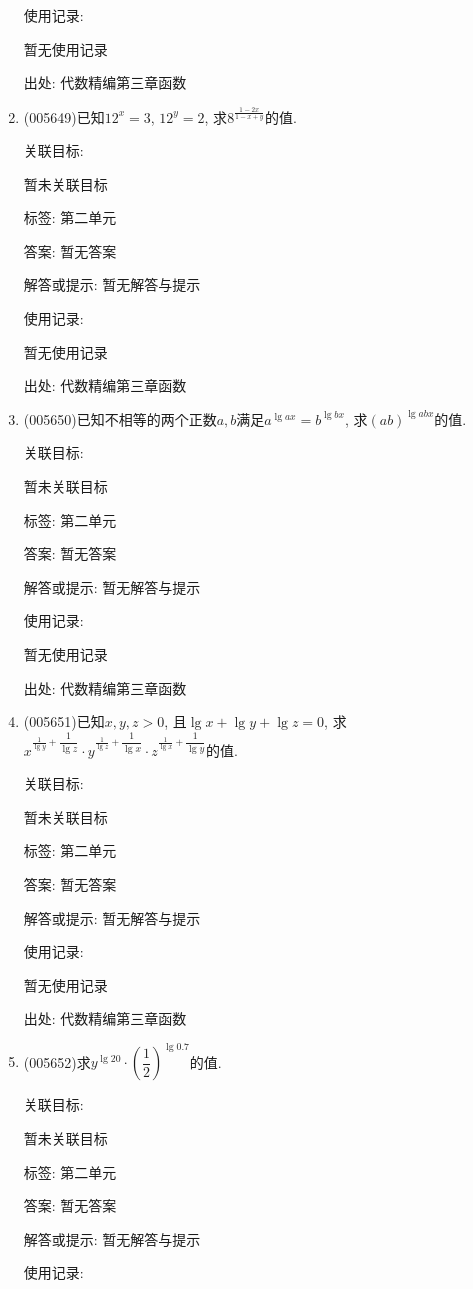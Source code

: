 \documentclass[10pt,a4paper]{article}
\begin{document}
\begin{enumerate}[1.]
使用记录:

暂无使用记录


出处: 代数精编第三章函数
\item { (005649)}已知$12^x=3$, $12^y=2$, 求$8^{\frac{1-2x}{1-x+y}}$的值.


关联目标:

暂未关联目标



标签: 第二单元

答案: 暂无答案

解答或提示: 暂无解答与提示

使用记录:

暂无使用记录


出处: 代数精编第三章函数
\item { (005650)}已知不相等的两个正数$a,b$满足$a^{\lg ax}=b^{\lg bx}$, 求$(ab)^{\lg abx}$的值.


关联目标:

暂未关联目标



标签: 第二单元

答案: 暂无答案

解答或提示: 暂无解答与提示

使用记录:

暂无使用记录


出处: 代数精编第三章函数
\item { (005651)}已知$x,y,z>0$, 且$\lg x+\lg y+\lg z=0$, 求$x^{\frac 1{\lg y}+\dfrac 1{\lg z}}\cdot y^{\frac 1{\lg z}+\dfrac 1{\lg x}}\cdot z^{\frac 1{\lg x}+\dfrac 1{\lg y}}$的值.


关联目标:

暂未关联目标



标签: 第二单元

答案: 暂无答案

解答或提示: 暂无解答与提示

使用记录:

暂无使用记录


出处: 代数精编第三章函数
\item { (005652)}求$y^{\lg 20}\cdot (\dfrac 12)^{\lg 0.7}$的值.


关联目标:

暂未关联目标



标签: 第二单元

答案: 暂无答案

解答或提示: 暂无解答与提示

使用记录:


\end{enumerate}
\end{document}
